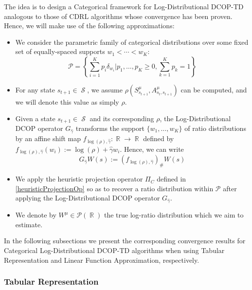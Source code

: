 \documentclass[12pt,a4paper,openright,twoside]{article}
\DeclareMathOperator*{\R}{\mathbb{R}}
\DeclareMathOperator*{\Sspace}{\mathcal{S}}
\numberwithin{equation}{section}
\theoremstyle{definition}
\theoremstyle{remark}
\theoremstyle{plain}
\begin{document}
The idea is to design a Categorical framework for Log-Distributional DCOP-TD analogous to those of CDRL algorithms whose convergence has been proven. Hence, we will make use of the following approximations:
\begin{itemize}
	\item We consider the parametric family of categorical distributions over some fixed set of equally-spaced supports $w_1 < \cdots < w_K$:
		\begin{equation*}
			\mathcal{P} = \left\{ \sum_{i=1}^{K} p_i \delta_{w_i} \Big| p_1, \dots , p_K \geq 0, \sum_{k=1}^{K} p_k = 1 \right\}
		\end{equation*}
		
	\item For any state $s_{t+1} \in \Sspace$, we assume $\rho(S^{\mu}_{s_{t+1}},A^{\mu}_{s_{t},s_{t+1}})$ can be computed, and we will denote this value as simply $\rho$.
	
	\item Given a state $s_{t+1} \in \Sspace$ and its corresponding $\rho$, the Log-Distributional DCOP operator $G_{\hat{\gamma}}$ transforms the support $\{w_1,\dots,w_K\}$ of ratio distributions by an affine shift map $f_{\log(\rho),\hat{\gamma}} : \R \rightarrow \R$ defined by $f_{\log(\rho),\hat{\gamma}}(w_i) := \log(\rho) + \hat{\gamma} w_i$. Hence, we can write
		\begin{equation*}
			G_{\hat{\gamma}} W(s) := (f_{\log(\rho),\hat{\gamma}})_{\#} W(s)
		\end{equation*} 
	
	\item We apply the heuristic projection operator $\Pi_C$ defined in \ref{heuristicProjectionOp} so as to recover a ratio distribution within $\mathcal{P}$ after applying the Log-Distributional DCOP operator $G_{\hat{\gamma}}$.

	\item We denote by $W^\mu \in \mathscr{P}(\R)$ the true log-ratio distribution which we aim to estimate.
\end{itemize}


In the following subsections we present the corresponding convergence results for Categorical Log-Distributional DCOP-TD algorithms when using Tabular Representation and Linear Function Approximation, respectively. 






\subsubsection{Tabular Representation}
\end{document}
